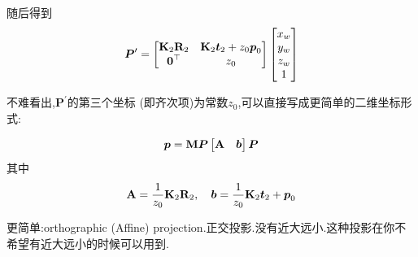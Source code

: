 随后得到
\begin{equation}
	\boldsymbol P^\prime = 
	\begin{bmatrix}
		\bold{K}_2 \bold{R}_2 & \bold{K}_2 \boldsymbol t_2 + z_0 \boldsymbol p_0
		\\
		\boldsymbol 0^\top & z_0
	\end{bmatrix}
	\begin{bmatrix}
		x_w
		\\
		y_w 
		\\
		z_w
		\\
		1
	\end{bmatrix}
\end{equation}

不难看出,$\bm P^\prime$的第三个坐标 (即齐次项)为常数$z_0$,可以直接写成更简单的二维坐标形式:

\begin{equation}
	\boldsymbol p = \bold{M} \boldsymbol P
	\begin{bmatrix}
		\bold{A} & \boldsymbol b
	\end{bmatrix} \boldsymbol P
\end{equation}
其中
\begin{equation}
	\bold{A} = \frac{1}{z_0} \bold{K}_2 \bold{R}_2, \quad \boldsymbol b = \frac{1}{z_0} \bold{K}_2 \boldsymbol t_2 + \boldsymbol p_0
\end{equation}


更简单:orthographic (Affine) projection.正交投影.没有近大远小.这种投影在你不希望有近大远小的时候可以用到.